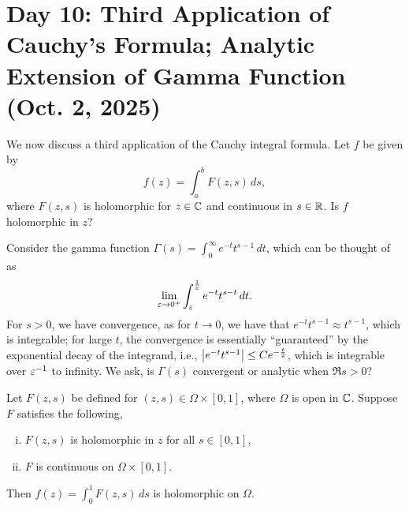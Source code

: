 \section{Day 10: Third Application of Cauchy's Formula; Analytic Extension of Gamma Function (Oct. 2, 2025)}
We now discuss a third application of the Cauchy integral formula. Let $f$ be given by
\[ f(z) = \int_a^b F(z, s) \, ds, \]
where $F(z, s)$ is holomorphic for $z \in \mathbb C$ and continuous in $s \in \mathbb R$. Is $f$ holomorphic in $z$?
\begin{example}
    Consider the gamma function $\Gamma(s) = \int_0^\infty e^{-t} t^{s-1} \, dt$, which can be thought of as
    \[ \lim_{\varepsilon \to 0^+} \int_\varepsilon^{\frac{1}{\varepsilon}} e^{-t} t^{s-t} \, dt. \]
    For $s > 0$, we have convergence, as for $t \to 0$, we have that $e^{-t} t^{s-1} \approx t^{s-1}$, which is integrable; for large $t$, the convergence is essentially ``guaranteed'' by the exponential decay of the integrand, i.e., $\left\lvert e^{-t} t^{s-1} \right\rvert \leq C e^{-\frac{t}{2}}$, which is integrable over $\varepsilon^{-1}$ to infinity. We ask, is $\Gamma(s)$ convergent or analytic when $\Re s > 0$?
\end{example}
\begin{theorem}
    Let $F(z, s)$ be defined for $(z, s) \in \Omega \times [0, 1]$, where $\Omega$ is open in $\mathbb C$. Suppose $F$ satisfies the following,
    \begin{enumerate}[(i)]
        \item $F(z, s)$ is holomorphic in $z$ for all $s \in [0, 1]$,
        \item $F$ is continuous on $\Omega \times [0, 1]$.
    \end{enumerate}
    Then $f(z) = \int_0^1 F(z, s) \, ds$ is holomorphic on $\Omega$.
\end{theorem}
